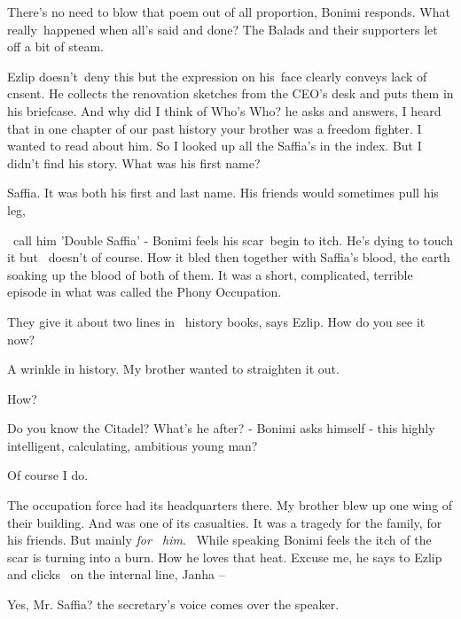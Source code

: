 \documentclass[letterpaper]{article}
\begin{document}
{\textquotedbl}There's no need to blow that poem out of all proportion,{\textquotedbl} Bonimi responds.
{\textquotedbl}What really~happened when all's said and done? The Balads and their supporters let off a bit of
steam.{\textquotedbl} 

Ezlip doesn't~deny this but the expression on his~face clearly conveys lack of cnsent. He collects the renovation
sketches from the CEO's desk and puts them in his briefcase. {\textquotedbl}And why did I think of Who's
Who?{\textquotedbl} he asks and answers, {\textquotedbl}I heard that in one chapter of our past history your brother
was a freedom fighter. I wanted to read about him. So I looked up all the Saffia's in the index. But I didn't find his
story. What was his first name?{\textquotedbl}~ 

{\textquotedbl}Saffia. It was both his first and last name. His friends would sometimes pull his leg, 

\ call him 'Double Saffia' -{\textquotedbl} Bonimi feels his scar~begin to itch. He's dying to touch it but \ doesn't of
course. How it bled then together with Saffia's blood, the earth soaking up the blood of both of them.
{\textquotedbl}It was a short, complicated, terrible episode in what was called the Phony Occupation.{\textquotedbl} 

{\textquotedbl}They give it about two lines in \ history books,{\textquotedbl} says Ezlip. {\textquotedbl}How do you see
it now?{\textquotedbl} 

{\textquotedbl}A wrinkle in history. My brother wanted to straighten it out.{\textquotedbl} 

{\textquotedbl}How?{\textquotedbl} 

{\textquotedbl}Do you know the Citadel?{\textquotedbl} What's he after? - Bonimi asks himself - this highly intelligent,
calculating, ambitious young man? 

{\textquotedbl}Of course I do.{\textquotedbl} 

{\textquotedbl}The occupation force had its headquarters there. My brother blew up one wing of their building. And was
one of its casualties. It was a tragedy for the family, for his friends. But mainly \textit{for \ him}.{\textquotedbl}
\ While speaking Bonimi feels the itch of the scar is turning into a burn. How he loves that heat.
{\textquotedbl}Excuse me,{\textquotedbl} he says to Ezlip and clicks \ on the internal line, {\textquotedbl}Janha --
{\textquotedbl} 

{\textquotedbl}Yes, Mr. Saffia?{\textquotedbl} the secretary's voice comes over the speaker.
\end{document}

